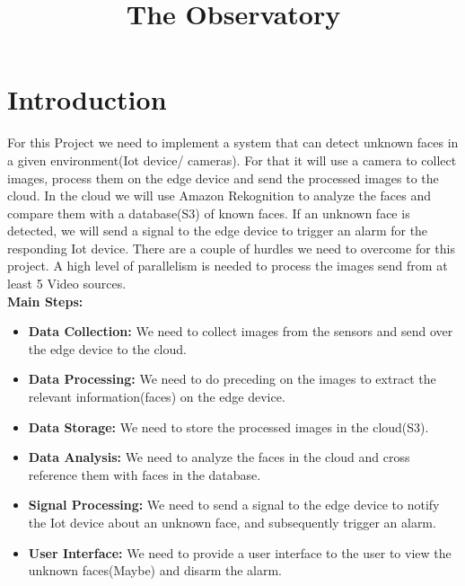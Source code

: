 \documentclass[conference]{IEEEtran}
\begin{document}
\title{The Observatory}

\author{
\and
{}
\and
{}
}

\maketitle

\section{Introduction}
For this Project we need to implement a system that can detect unknown faces in a given environment(Iot device/ cameras). For that it will
use a camera to collect images, process them on the edge device and send the processed images to the cloud. In the cloud
we will use Amazon Rekognition to analyze the faces and compare them with a database(S3) of known faces. If an unknown face
is detected, we will send a signal to the edge device to trigger an alarm for the responding Iot device.
There are a couple of hurdles we need to overcome for this project. A high level of parallelism is needed to process the images
send from at least 5 Video sources.
\\
\textbf{Main Steps:}
\begin{itemize}
    \item \textbf{Data Collection:} We need to collect images from the sensors and send over the edge device to the cloud.
    \item \textbf{Data Processing:} We need to do preceding on the images to extract the relevant information(faces) on the edge device.
    \item \textbf{Data Storage:} We need to store the processed images in the cloud(S3).
    \item \textbf{Data Analysis:} We need to analyze the faces in the cloud and cross reference them with faces in the database.
    \item \textbf{Signal Processing:} We need to send a signal to the edge device to notify the Iot device about an unknown face, and subsequently trigger an alarm.
    \item \textbf{User Interface:} We need to provide a user interface to the user to view the unknown faces(Maybe) and disarm the alarm.
\end{itemize}
\end{document}
